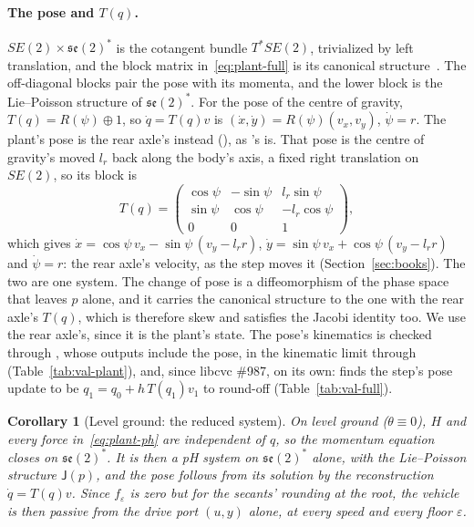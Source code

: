 \documentclass[11pt]{article}
\newtheorem{corollary}{Corollary}
\theoremstyle{remark}
\newcommand{\J}{\mathsf J}
\newcommand{\se}{\mathfrak{se}(2)}
\begin{document}
\paragraph{The pose and $T(q)$.} $SE(2)\times\se^*$ is the cotangent bundle $T^*SE(2)$, trivialized
by left translation, and the block matrix in~\eqref{eq:plant-full} is its canonical
structure~\cite{marsden1999}. The off-diagonal blocks pair the pose with its momenta, and the
lower block is the Lie--Poisson structure of $\se^*$. For the pose of the centre of gravity,
$T(q)=R(\psi)\oplus1$, so $\dot q=T(q)v$ is $(\dot x,\dot y)=R(\psi)(v_x,v_y)$, $\dot\psi=r$. The
plant's pose is the rear axle's instead (), as 's is. That pose
is the centre of gravity's moved $l_r$ back along the body's axis, a fixed right translation on
$SE(2)$, so its block is
\begin{equation*}
  T(q)=\begin{pmatrix}\cos\psi&-\sin\psi&l_r\sin\psi\\\sin\psi&\cos\psi&-l_r\cos\psi\\0&0&1\end{pmatrix},
\end{equation*}
which gives $\dot x=\cos\psi\,v_x-\sin\psi\,(v_y-l_rr)$, $\dot y=\sin\psi\,v_x+\cos\psi\,(v_y-l_rr)$
and $\dot\psi=r$: the rear axle's velocity, as the step moves it (Section~\ref{sec:books}). The
two are one system. The change of pose is a diffeomorphism of the phase space that leaves $p$
alone, and it carries the canonical structure to the one with the rear axle's $T(q)$, which is
therefore skew and satisfies the Jacobi identity too. We use the rear axle's, since it is the
plant's state. The pose's kinematics is checked through , whose outputs
include the pose, in the kinematic limit through 
(Table~\ref{tab:val-plant}), and, since libcvc \#987, on its own:
 finds the step's pose update to be $q_1=q_0+h\,T(q_1)v_1$ to
round-off (Table~\ref{tab:val-full}).

\begin{corollary}[Level ground: the reduced system]
\label{cor:level}
On level ground ($\theta\equiv0$), $H$ and every force in~\eqref{eq:plant-ph} are independent of
$q$, so the momentum equation closes on $\se^*$. It is then a pH system on $\se^*$ alone, with the
Lie--Poisson structure $\J(p)$, and the pose follows from its solution by the reconstruction
$\dot q=T(q)v$. Since $f_\varepsilon$ is zero but for the secants' rounding at the root, the
vehicle is then passive from the drive port $(u,y)$ alone, at every speed and every floor
$\varepsilon$.
\end{corollary}
\end{document}
